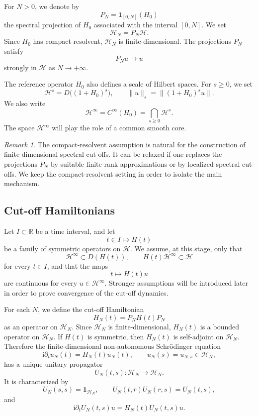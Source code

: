 \documentclass[11pt]{amsart}
\theoremstyle{plain}
\theoremstyle{definition}
\theoremstyle{remark}
\newtheorem{remark}[theorem]{Remark}
\newcommand{\Hilb}{\mathcal H}
\newcommand{\Id}{\mathbf 1}
\newcommand{\ii}{\mathrm i}
\begin{document}
For \(N>0\), we denote by
\[
        P_N=\mathbf 1_{[0,N]}(H_0)
\]
the spectral projection of \(H_0\) associated with the interval
\([0,N]\).  We set
\[
        \Hilb_N=P_N\Hilb.
\]
Since \(H_0\) has compact resolvent, \(\Hilb_N\) is finite-dimensional.
The projections \(P_N\) satisfy
\[
        P_Nu\longrightarrow u
\]
strongly in \(\Hilb\) as \(N\to+\infty\).

The reference operator \(H_0\) also defines a scale of Hilbert spaces.
For \(s\geq0\), we set
\[
        \Hilb^s=D\big((1+H_0)^s\big),
        \qquad
        \|u\|_s=\|(1+H_0)^s u\|.
\]
We also write
\[
        \Hilb^\infty
        =
        C^\infty(H_0)
        =
        \bigcap_{s\geq0}\Hilb^s.
\]
The space \(\Hilb^\infty\) will play the role of a common smooth core.

\begin{remark}
The compact-resolvent assumption is natural for the construction of
finite-dimensional spectral cut-offs.  It can be relaxed if one replaces
the projections \(P_N\) by suitable finite-rank approximations or by
localized spectral cut-offs.  We keep the compact-resolvent setting in
order to isolate the main mechanism.
\end{remark}

\subsection{Cut-off Hamiltonians}

Let \(I\subset\mathbb R\) be a time interval, and let
\[
        t\in I\longmapsto H(t)
\]
be a family of symmetric operators on \(\Hilb\).  We assume, at this
stage, only that
\[
        \Hilb^\infty\subset D(H(t)),
        \qquad
        H(t)\Hilb^\infty\subset \Hilb
\]
for every \(t\in I\), and that the maps
\[
        t\longmapsto H(t)u
\]
are continuous for every \(u\in \Hilb^\infty\).  Stronger assumptions
will be introduced later in order to prove convergence of the cut-off
dynamics.

For each \(N\), we define the cut-off Hamiltonian
\[
        H_N(t)=P_NH(t)P_N
\]
as an operator on \(\Hilb_N\).  Since \(\Hilb_N\) is finite-dimensional,
\(H_N(t)\) is a bounded operator on \(\Hilb_N\).  If \(H(t)\) is
symmetric, then \(H_N(t)\) is self-adjoint on \(\Hilb_N\).  Therefore
the finite-dimensional non-autonomous Schr\"odinger equation
\[
        \ii\partial_t u_N(t)=H_N(t)u_N(t),
        \qquad
        u_N(s)=u_{N,s}\in \Hilb_N,
\]
has a unique unitary propagator
\[
        U_N(t,s):\Hilb_N\to\Hilb_N.
\]
It is characterized by
\[
        U_N(s,s)=\Id_{\Hilb_N},
        \qquad
        U_N(t,r)U_N(r,s)=U_N(t,s),
\]
and
\[
        \ii\partial_t U_N(t,s)u=H_N(t)U_N(t,s)u.
\]
\end{document}
